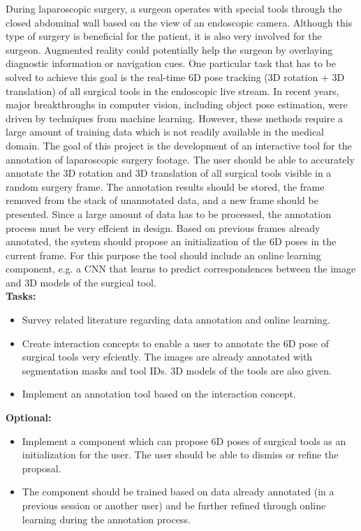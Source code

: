 \noindent During laparoscopic surgery, a surgeon operates with special tools through the closed abdominal wall based on the view of an endoscopic camera. Although this type of surgery is beneficial for the patient, it is also very involved for the surgeon. Augmented reality could potentially help the surgeon by overlaying diagnostic information or navigation cues. One particular task that has to be solved to achieve this goal is the real-time 6D pose tracking (3D rotation + 3D translation) of all surgical tools in the endoscopic live stream. In recent years, major breakthroughs in computer vision, including object pose estimation, were driven by techniques from machine learning. However, these methods require a large amount of training data which is not readily available in the medical domain. The goal of this project is the development of an interactive tool for the annotation of laparoscopic surgery footage. The user should be able to accurately annotate the 3D rotation and 3D translation of all surgical tools visible in a random surgery frame. The annotation results should be stored, the frame removed from the stack of unannotated data, and a new frame should be presented. Since a large amount of data has to be processed, the annotation process must be very effcient in design. Based on previous frames already annotated, the system should propose an initialization of the 6D poses in the current frame. For this purpose the tool should include an online learning component, e.g. a CNN that learns to predict correspondences between the image and 3D models of the surgical tool. \\

\textbf{Tasks:}

\begin{itemize}
\item Survey related literature regarding data annotation and online learning.
\item Create interaction concepts to enable a user to annotate the 6D pose of surgical tools very efciently. The images are already annotated with segmentation masks and tool IDs. 3D models of the tools are also given.
\item Implement an annotation tool based on the interaction concept.
\end{itemize}

\textbf{Optional:}

\begin{itemize}
\item Implement a component which can propose 6D poses of surgical tools as an initialization for the user. The user should be able to dismiss or refine the proposal.
\item The component should be trained based on data already annotated (in a previous session or another user) and be further refined through online learning during the annotation process.
\end{itemize}

\vspace{10mm}

\par\noindent\makebox[2.5in]{\hrulefill} \hfill\makebox[2.5in]{\hrulefill}%
\par\noindent{}      \hfill{}%